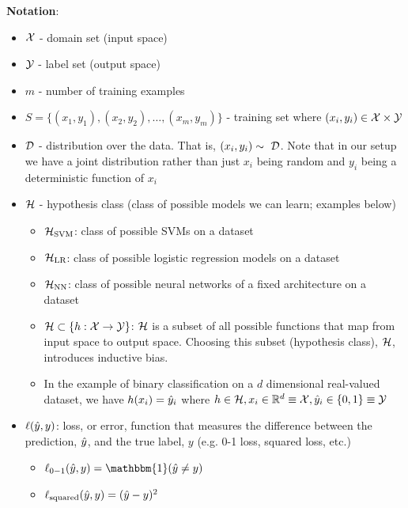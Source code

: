 \documentclass{article}
\begin{document}
\textbf{Notation}:
\begin{itemize}
    \item $\mathcal{X}$ - domain set (input space)
    
    \item $\mathcal{Y}$ - label set (output space)
    
    \item $m$ - number of training examples
    
    \item $S = \{(x_1, y_1), (x_2, y_2), \dots, (x_m, y_m)\}$ - training set where $(x_i, y_i) \in \mathcal{X} \times \mathcal{Y}$
    
    \item $\mathcal{D}$ - distribution over the data. That is, $(x_i, y_i) \sim ~ \mathcal{D}$. Note that in our setup we have a joint distribution rather than just $x_i$ being random and $y_i$ being a deterministic function of $x_i$
    
    \item $\mathcal{H}$ - hypothesis class (class of possible models we can learn; examples below)
    
    \begin{itemize}
    
        \item $\mathcal{H}_{\text{SVM}}$: class of possible SVMs on a dataset
        
        \item $\mathcal{H}_{\text{LR}}$: class of possible logistic regression models on a dataset
        
        \item $\mathcal{H}_{\text{NN}}$: class of possible neural networks of a fixed architecture on a dataset
        
        \item $\mathcal{H} \subset \{h: \mathcal{X} \rightarrow \mathcal{Y}\}$: $\mathcal{H}$ is a subset of all possible functions that map from input space to output space. Choosing this subset (hypothesis class), $\mathcal{H}$, introduces inductive bias.
        
        \item In the example of binary classification on a $d$ dimensional real-valued dataset, we have $h(x_i) = \hat{y}_i$ where $h \in \mathcal{H}, x_i \in \mathbb{R}^d \equiv \mathcal{X}, \hat{y}_i \in \{0, 1\} \equiv \mathcal{Y}$
        
    \end{itemize}
    
    \item $\ell(\hat{y}, y)$: loss, or error, function that measures the difference between the prediction, $\hat{y}$, and the true label, $y$ (e.g. 0-1 loss, squared loss, etc.)
    
    \begin{itemize}
    
        \item $\ell_{0-1}(\yhat, y) = \mathbbm{1}(\yhat \neq y)$
        
        \item $\ell_{\text{squared}}(\hat{y}, y) = (\hat{y} - y)^2$
        
    \end{itemize}
    
\end{itemize}
\end{document}
